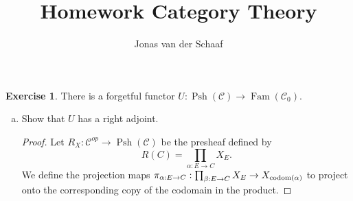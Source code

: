 \documentclass{article}
\title{Homework Category Theory}
\author{Jonas van der Schaaf}
\date{}
\newcommand{\cat}{\mathcal{C}}
\DeclareMathOperator{\psh}{Psh} \DeclareMathOperator{\famm}{Fam}
\theoremstyle{definition}
\newtheorem{question}{Exercise}
\begin{document}
\maketitle

\begin{question}
    There is a forgetful functor \(U:\psh(\cat)\to\famm(\cat_{0})\).

    \begin{enumerate}[(a)]
        \item Show that \(U\) has a right adjoint.

              \begin{proof}
                  Let \(R_{X}:\cat^{op}\to\psh(\cat)\) be
                  the presheaf defined by
                  \[
                      R(C)=\prod_{\alpha:E\to C}X_{E}.
                  \]
                  We define the projection maps \(\pi_{\alpha:E\to
                      C}:\prod_{\beta:E\to C}X_{E}\to X_{\operatorname{codom}(\alpha)}\) to
                  project onto the corresponding copy of the codomain in the
                  product.


\end{proof}
\end{enumerate}
\end{question}
\end{document}
